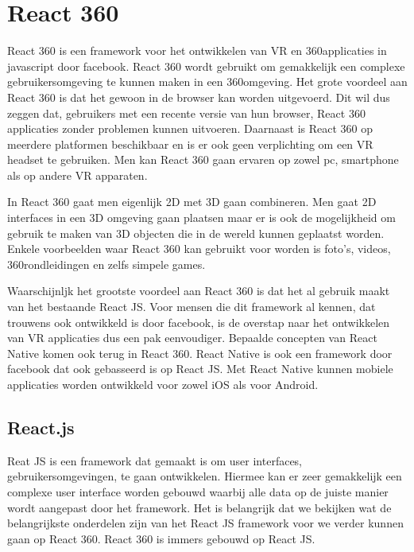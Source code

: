 \chapter{React 360}
\label{ch:react-360}

React 360 is een framework voor het ontwikkelen van VR en 360\textdegree applicaties in javascript door facebook. React 360 wordt gebruikt om gemakkelijk een complexe gebruikersomgeving te kunnen maken in een 360\textdegree omgeving. Het grote voordeel aan React 360 is dat het gewoon in de browser kan worden uitgevoerd. Dit wil dus zeggen dat, gebruikers met een recente versie van hun browser, React 360 applicaties zonder problemen kunnen uitvoeren. Daarnaast is React 360 op meerdere platformen beschikbaar en is er ook geen verplichting om een VR headset te gebruiken. Men kan React 360 gaan ervaren op zowel pc, smartphone als op andere VR apparaten.

In React 360 gaat men eigenlijk 2D met 3D gaan combineren. Men gaat 2D interfaces in een 3D omgeving gaan plaatsen maar er is ook de mogelijkheid om gebruik te maken van 3D objecten die in de wereld kunnen geplaatst worden. Enkele voorbeelden waar React 360 kan gebruikt voor worden is foto's, videos, 360\textdegree rondleidingen en zelfs simpele games.

Waarschijnljk het grootste voordeel aan React 360 is dat het al gebruik maakt van het bestaande React JS. Voor mensen die dit framework al kennen, dat trouwens ook ontwikkeld is door facebook, is de overstap naar het ontwikkelen van VR applicaties dus een pak eenvoudiger. Bepaalde concepten van React Native komen ook terug in React 360. React Native is ook een framework door facebook dat ook gebasseerd is op React JS. Met React Native kunnen mobiele applicaties worden ontwikkeld voor zowel iOS als voor Android.

\section{React.js}
\label{sec:reactjs}
Reat JS is een framework dat gemaakt is om user interfaces, gebruikersomgevingen, te gaan ontwikkelen. Hiermee kan er zeer gemakkelijk een complexe user interface worden gebouwd waarbij alle data op de juiste manier wordt aangepast door het framework. Het is belangrijk dat we bekijken wat de belangrijkste onderdelen zijn van het React JS framework voor we verder kunnen gaan op React 360. React 360 is immers gebouwd op React JS.

